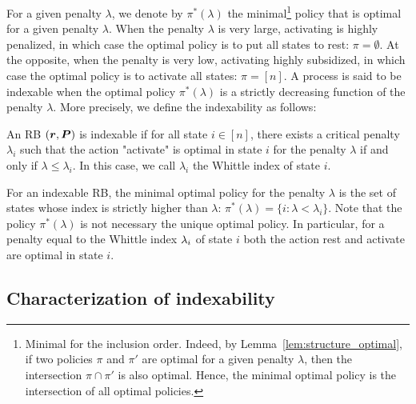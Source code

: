 \documentclass[acmsmall,screen,anonymous]{acmart}
\begin{document}
For a given penalty $\lambda$, we denote by $\pi^*(\lambda)$ the minimal\footnote{Minimal for the inclusion order. Indeed, by Lemma~\ref{lem:structure_optimal}, if two policies $\pi$ and $\pi'$ are optimal for a given penalty $\lambda$, then the intersection $\pi\cap\pi'$ is also optimal. Hence, the minimal optimal policy is the intersection of all optimal policies. } policy that is optimal for a given penalty $\lambda$.  When the penalty $\lambda$ is very large, activating is highly penalized, in which case the optimal policy is to put all states to rest: $\pi=\emptyset$. At the opposite, when the penalty is very low, activating highly subsidized, in which case the optimal policy is to activate all states: $\pi=[n]$. A process is said to be indexable when the optimal policy $\pi^*(\lambda)$ is a strictly decreasing function of the penalty $\lambda$. More precisely, we define the indexability as follows:
\begin{definition}[Indexability]
    \label{def:indexability}
    An RB $(\boldsymbol{r},\boldsymbol{P})$ is indexable if for all state $i\in[n]$, there exists a critical penalty $\lambda_i$ such that the action "activate" is optimal in state $i$ for the penalty $\lambda$ if and only if $\lambda\le\lambda_i$. In this case, we call $\lambda_i$ the Whittle index of state $i$.
\end{definition}
For an indexable RB, the minimal optimal policy for the penalty $\lambda$ is the set of states whose index is strictly higher than $\lambda$: $\pi^*(\lambda)=\{i : \lambda < \lambda_i\}$. Note that the policy $\pi^*(\lambda)$ is not necessary the unique optimal policy. In particular, for a penalty equal to the Whittle index $\lambda_i$ of state $i$ both the action rest and activate are optimal in state $i$.


\subsection{Characterization of indexability}
\end{document}
